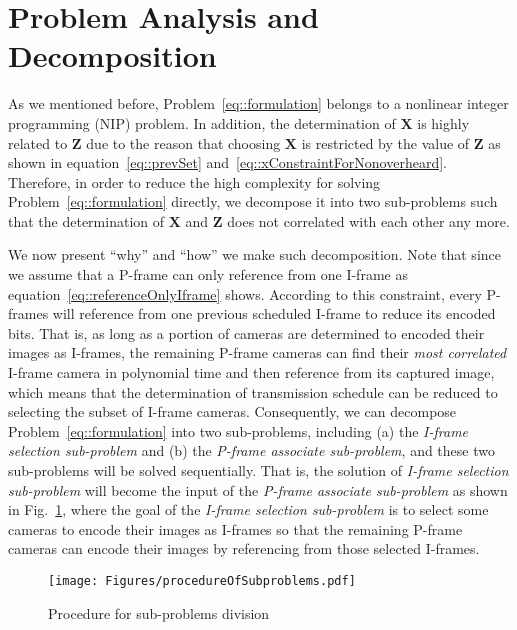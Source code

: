 \section{Problem Analysis and Decomposition}
\label{sec::OverallProbAnalysis}
%
As we mentioned before, Problem~\eqref{eq::formulation} belongs to a nonlinear integer programming (NIP) problem.
In addition, the determination of $\mathbf{X}$ is highly related to $\mathbf{Z}$ due to the reason that choosing $\mathbf{X}$ is restricted by the value of $\mathbf{Z}$ as shown in equation~\eqref{eq::prevSet} and~\eqref{eq::xConstraintForNonoverheard}.
Therefore, in order to reduce the high complexity for solving Problem~\eqref{eq::formulation} directly, we decompose it into two sub-problems such that the determination of $\mathbf{X}$ and $\mathbf{Z}$ does not correlated with each other any more.

We now present ``why'' and ``how'' we make such decomposition.
Note that since we assume that a P-frame can only reference from one I-frame as equation~\eqref{eq::referenceOnlyIframe} shows.
According to this constraint, every P-frames will reference from one previous scheduled I-frame to reduce its encoded bits.
That is, as long as a portion of cameras are determined to encoded their images as I-frames, the remaining P-frame cameras can find their \emph{most correlated} I-frame camera in polynomial time and then reference from its captured image, which means that the determination of transmission schedule can be reduced to selecting the subset of I-frame cameras.
Consequently, we can decompose Problem~\eqref{eq::formulation} into two sub-problems, including (a) the \emph{I-frame selection sub-problem} and (b) the \emph{P-frame associate sub-problem}, and these two sub-problems will be solved sequentially.
That is, the solution of \emph{I-frame selection sub-problem} will become the input of the \emph{P-frame associate sub-problem} as shown in Fig.~\ref{fig::subProbProcedure}, where the goal of the \emph{I-frame selection sub-problem} is to select some cameras to encode their images as I-frames so that the remaining P-frame cameras can encode their images by referencing from those selected I-frames.
%
\begin{figure}
\begin{center}
\texttt{[image: Figures/procedureOfSubproblems.pdf]}
\caption{\label{fig::subProbProcedure}Procedure for sub-problems division}
\end{center}
\end{figure}
%

